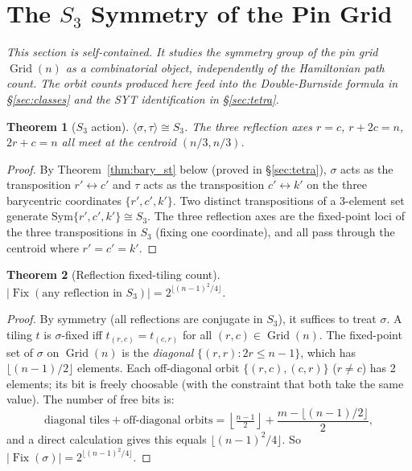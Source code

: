 \documentclass[12pt,reqno]{amsart}
\theoremstyle{plain}
\newtheorem{theorem}{Theorem}[section]
\theoremstyle{definition}
\theoremstyle{remark}
\DeclareMathOperator{\Fix}{Fix}
\DeclareMathOperator{\Grid}{Grid}
\begin{document}
\section{The $S_3$ Symmetry of the Pin Grid}
\label{sec:S3}

\noindent\textit{This section is self-contained. It studies the symmetry group of the pin grid $\Grid(n)$ as a combinatorial object, independently of the Hamiltonian path count. The orbit counts produced here feed into the Double-Burnside formula in \S\ref{sec:classes} and the SYT identification in \S\ref{sec:tetra}.}

\begin{theorem}[$S_3$ action]\label{thm:S3}
$\langle\sigma,\tau\rangle\cong S_3$. The three reflection axes
$r=c$, $r+2c=n$, $2r+c=n$ all meet at the centroid $(n/3,n/3)$.
\end{theorem}
\begin{proof}
By Theorem~\ref{thm:bary_st} below (proved in \S\ref{sec:tetra}),
$\sigma$ acts as the transposition
$r'\leftrightarrow c'$ and $\tau$ acts as the transposition $c'\leftrightarrow k'$
on the three barycentric coordinates $\{r',c',k'\}$. Two distinct transpositions
of a 3-element set generate $\mathrm{Sym}\{r',c',k'\}\cong S_3$. The three
reflection axes are the fixed-point loci of the three transpositions in $S_3$
(fixing one coordinate), and all pass through the centroid where $r'=c'=k'$.
\end{proof}

\begin{theorem}[Reflection fixed-tiling count]\label{thm:fixsigma}
$|\Fix(\text{any reflection in }S_3)| = 2^{\lfloor(n-1)^2/4\rfloor}$.
\end{theorem}
\begin{proof}
By symmetry (all reflections are conjugate in $S_3$), it suffices to treat
$\sigma$. A tiling $t$ is $\sigma$-fixed iff $t_{(r,c)} = t_{(c,r)}$ for all
$(r,c)\in\Grid(n)$. The fixed-point set of $\sigma$ on $\Grid(n)$ is the
\emph{diagonal} $\{(r,r) : 2r \leq n-1\}$, which has $\lfloor(n-1)/2\rfloor$
elements. Each off-diagonal orbit $\{(r,c),(c,r)\}$ ($r\neq c$) has 2 elements;
its bit is freely choosable (with the constraint that both take the same value).
The number of free bits is:
\[\text{diagonal tiles} + \text{off-diagonal orbits}
= \left\lfloor\tfrac{n-1}{2}\right\rfloor +
\frac{m - \lfloor(n-1)/2\rfloor}{2},\]
and a direct calculation gives this equals $\lfloor(n-1)^2/4\rfloor$.
So $|\Fix(\sigma)| = 2^{\lfloor(n-1)^2/4\rfloor}$.
\end{proof}
\end{document}
